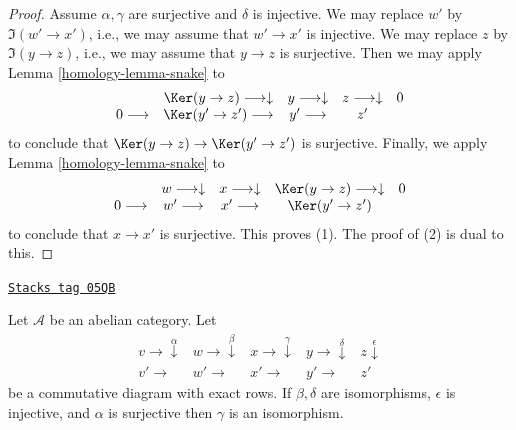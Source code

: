 \begin{proof}

Assume $\alpha, \gamma$ are surjective and $\delta$ is injective.
We may replace $w'$ by $\Im(w' \to x')$, i.e., we may assume
that $w' \to x'$ is injective.
We may replace $z$ by $\Im(y \to z)$, i.e., we may assume that
$y \to z$ is surjective. Then we may apply
Lemma \ref{homology-lemma-snake}
to
$$
\begin{array}{ccccc} & \Ker(y \to z) \longrightarrow\downarrow & y \longrightarrow\downarrow & z \longrightarrow\downarrow & 0 \\ 0 \longrightarrow & \Ker(y' \to z') \longrightarrow & y' \longrightarrow & z' & \end{array}
$$
to conclude that $\Ker(y \to z) \to \Ker(y' \to z')$ is
surjective. Finally, we apply
Lemma \ref{homology-lemma-snake}
to
$$
\begin{array}{ccccc} & w \longrightarrow\downarrow & x \longrightarrow\downarrow & \Ker(y \to z) \longrightarrow\downarrow & 0 \\ 0 \longrightarrow & w' \longrightarrow & x' \longrightarrow & \Ker(y' \to z') & \end{array}
$$
to conclude that $x \to x'$ is surjective. This proves (1). The proof
of (2) is dual to this.
\end{proof}

\begin{lemma}
\label{homology-lemma-five-lemma}
\href{https://stacks.math.columbia.edu/tag/05QB}{\texttt{Stacks tag 05QB}}

\begin{reference}
\cite[Lemma 4.5 page 16]{Eilenberg-Steenrod}
\end{reference}
Let $\mathcal{A}$ be an abelian category. Let
$$
\begin{array}{ccccc}v \longrightarrow\overset{\alpha}{\downarrow} & w \longrightarrow\overset{\beta}{\downarrow} & x \longrightarrow\overset{\gamma}{\downarrow} & y \longrightarrow\overset{\delta}{\downarrow} & z \overset{\epsilon}{\downarrow} \\ v' \longrightarrow & w' \longrightarrow & x' \longrightarrow & y' \longrightarrow & z'\end{array}
$$
be a commutative diagram with exact rows. If $\beta, \delta$
are isomorphisms, $\epsilon$ is injective, and $\alpha$ is surjective
then $\gamma$ is an isomorphism.
\end{lemma}


